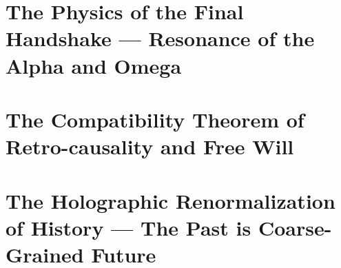 \documentclass[11pt,a4paper,twoside]{book}
\begin{document}
\chapter{The Physics of the Final Handshake --- Resonance of the Alpha and Omega}

\chapter{The Compatibility Theorem of Retro-causality and Free Will}

\chapter{The Holographic Renormalization of History --- The Past is Coarse-Grained Future}


\backmatter




\end{document}
